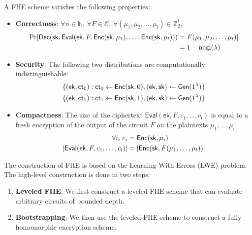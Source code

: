 \documentclass[12pt]{tufte-book}
\newcommand{\ek}{\mathsf{ek}}
\begin{document}
A FHE scheme satisfies the following properties:
\begin{itemize}
    \item \textbf{Correctness}: $\forall n \in \mathbb{N},\, \forall F \in \mathcal{C},\, \forall (\mu_1, \mu_2, \dots, \mu_l) \in \mathbb{Z}_2^l$,
    \begin{align*}
        \Pr[\mathsf{Dec}(\sk, \mathsf{Eval}(\ek, F, \mathsf{Enc}(\sk, \mu_1), \dots, \mathsf{Enc}(\sk, \mu_l))) &= F(\mu_1, \mu_2, \dots, \mu_l)] \\
        &= 1 - \text{negl}(\lambda)
    \end{align*}

    \item \textbf{Security}: The following two distributions are computationally indistinguishable:
    \begin{align*}
        \{(\ek, \mathsf{ct}_0): \mathsf{ct}_0 \gets \mathsf{Enc}(\sk, 0), (\ek, \sk) \gets \mathsf{Gen}(1^\lambda)\} \\
        \{(\ek, \mathsf{ct}_1): \mathsf{ct}_1 \gets \mathsf{Enc}(\sk, 1), (\ek, \sk) \gets \mathsf{Gen}(1^\lambda)\}
    \end{align*}

    \item \textbf{Compactness}: The size of the ciphertext $\mathsf{Eval}(\ek, F, c_1, \ldots, c_l)$ is equal to a fresh encryption of the output of the circuit $F$ on the plaintexts $\mu_1, \ldots, \mu_l$:
    \begin{align*}
        \forall i,\, c_i &= \mathsf{Enc}(\sk, \mu_i) \\
        \lvert \mathsf{Eval}(\ek, F, c_1, \ldots, c_l) \rvert &= \lvert \mathsf{Enc}(\sk, F(\mu_1, \ldots, \mu_l)) \rvert
    \end{align*}
\end{itemize}

The construction of FHE is based on the Learning With Errors (LWE) problem. The high-level construction is done in two steps:
\begin{enumerate}
    \item \textbf{Leveled FHE}: We first construct a leveled FHE scheme that can evaluate arbitrary circuits of bounded depth.
    \item \textbf{Bootstrapping}: We then use the leveled FHE scheme to construct a fully homomorphic encryption scheme.
\end{enumerate}
\end{document}
